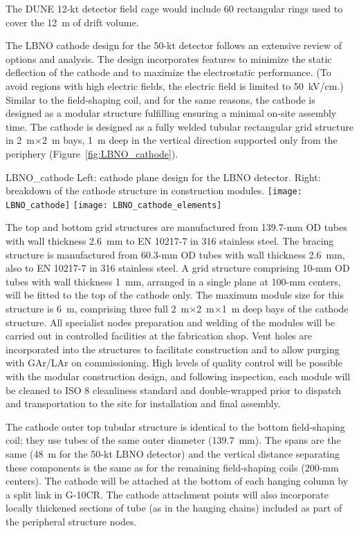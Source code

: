 The DUNE 12-kt detector field cage would include 60 rectangular rings
used to cover the 12~m of drift volume.

The LBNO cathode design for the 50-kt detector follows an extensive
review of options and analysis. The design incorporates features to
minimize the static deflection of the cathode and to maximize the
electrostatic performance. (To avoid regions with high electric
fields, the electric field is limited to 50~kV/cm.)  Similar to the
field-shaping coil, and for the same reasons, the cathode is designed
as a modular structure fulfilling ensuring a minimal on-site assembly
time. The cathode is designed as a fully welded tubular rectangular
grid structure in 2~m$\times$2~m bays, 1~m deep in the vertical
direction supported only from the periphery
(Figure~\ref{fig:LBNO_cathode}).
\begin{cdrfigure}{LBNO_cathode}
{\small Left: cathode plane design for the LBNO detector. Right: breakdown of 
the cathode structure in construction modules.}
\texttt{[image: LBNO\_cathode]} \hfil
\texttt{[image: LBNO\_cathode\_elements]}
\end{cdrfigure}

The top and bottom grid structures are manufactured from 139.7-mm OD
tubes with wall thickness 2.6~mm to EN 10217-7 in 316 stainless steel.
The bracing structure is manufactured from 60.3-mm OD tubes with wall
thickness 2.6~mm, also to EN 10217-7 in 316 stainless steel.  A grid
structure comprising 10-mm OD tubes with wall thickness 1~mm, arranged
in a single plane at 100-mm centers, will be fitted to the top of the
cathode only. The maximum module size for this structure is 6~m,
comprising three full 2~m$\times$2~m$\times$1~m deep bays of the
cathode structure.  All specialist nodes preparation and welding of
the modules will be carried out in controlled facilities at the
fabrication shop.  Vent holes are incorporated into the structures to
facilitate construction and to allow purging with GAr/LAr on
commissioning. High levels of quality control will be possible with
the modular construction design, and following inspection, each module
will be cleaned to ISO 8 cleanliness standard and double-wrapped prior
to dispatch and transportation to the site for installation and final
assembly.

The cathode outer top tubular structure is identical to the bottom
field-shaping coil; they use tubes of the same outer diameter
(139.7~mm).  The spans are the same (48~m for the 50-kt LBNO detector)
and the vertical distance separating these components is the same as
for the remaining field-shaping coils (200-mm centers). The cathode
will be attached at the bottom of each hanging column by a split link
in G-10CR. The cathode attachment points will also incorporate locally
thickened sections of tube (as in the hanging chains) included as part
of the peripheral structure nodes.
 
